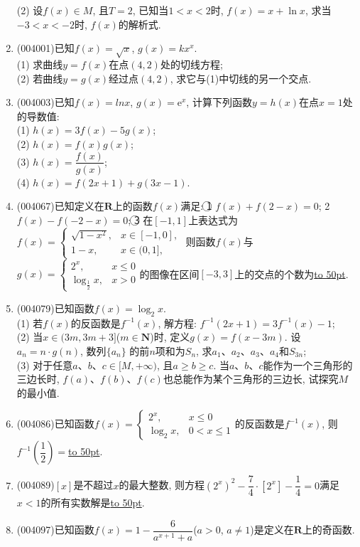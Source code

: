 \documentclass[10pt,a4paper]{article}
\newcommand{\blank}[1]{\underline{\hbox to #1pt{}}}
\begin{document}
\begin{enumerate}[1.]
(2) 设$f(x)\in M$, 且$T=2$, 已知当$1<x<2$时, $f(x)=x+\ln x$, 求当$-3<x<-2$时, $f(x)$的解析式.
\item {\tiny (004001)}已知$f(x)=\sqrt{x}$, $g(x)=kx^x$.\\
(1) 求曲线$y=f(x)$在点$(4,2)$处的切线方程;\\
(2) 若曲线$y=g(x)$经过点$(4,2)$, 求它与(1)中切线的另一个交点.
\item {\tiny (004003)}已知$f(x)=lnx$, $g(x)=\mathrm{e}^x$, 计算下列函数$y=h(x)$在点$x=1$处的导数值:\\
(1) $h(x)=3f(x)-5g(x)$;\\
(2) $h(x)=f(x)g(x)$;\\
(3) $h(x)=\dfrac{f(x)}{g(x)}$;\\
(4) $h(x)=f(2x+1)+g(3x-1)$.
\item {\tiny (004067)}已知定义在$\mathbf{R}$上的函数$f(x)$满足: \textcircled{1} $f(x)+f(2-x)=0$; \textcircled{2} $f(x)-f(-2-x)=0$; \textcircled{3} 在$[-1,1]$上表达式为$f(x)=\begin{cases} \sqrt{1-x^2}, & x\in [-1,0], \\ 1-x, & x\in (0,1], \end{cases}$ 则函数$f(x)$与$g(x)=\begin{cases} {2^x}, & x\le 0 \\ \log_\frac 12x, & x>0 \end{cases}$的图像在区间$[-3,3]$上的交点的个数为\blank{50}.
\item {\tiny (004079)}已知函数$f(x)=\log_2x$.\\
(1) 若$f(x)$的反函数是$f^{-1}(x)$, 解方程: $f^{-1}(2x+1)=3f^{-1}(x)-1$;\\
(2) 当$x\in (3m, 3m+3]$($m\in \mathbf{N}$)时, 定义$g(x)=f(x-3m)$. 设$a_n=n\cdot g(n)$, 数列$\{a_n\}$ 的前$n$项和为$S_n$, 求$a_1$、$a_2$、$a_3$、$a_4$和$S_{3n}$;\\
(3) 对于任意$a$、$b$、$c\in [M,+\infty)$, 且$a\ge b\ge c$. 当$a$、$b$、$c$能作为一个三角形的三边长时, $f(a)$、$f(b)$、$f(c)$也总能作为某个三角形的三边长, 试探究$M$的最小值.
\item {\tiny (004086)}已知函数$f(x)=\begin{cases} 2^x, & x\le 0 \\  \log_2x, & 0<x\le 1 \end{cases}$的反函数是$f^{-1}(x)$, 则$f^{-1}(\dfrac 12)=$\blank{50}.
\item {\tiny (004089)}$[x]$是不超过$x$的最大整数, 则方程$(2^x)^2-\dfrac 74\cdot [2^x]-\dfrac 14=0$满足$x<1$的所有实数解是\blank{50}.
\item {\tiny (004097)}已知函数$f(x)=1-\dfrac 6{a^{x+1}+a}$($a>0$, $a\ne 1$)是定义在$\mathbf{R}$上的奇函数.\\

\end{enumerate}
\end{document}
